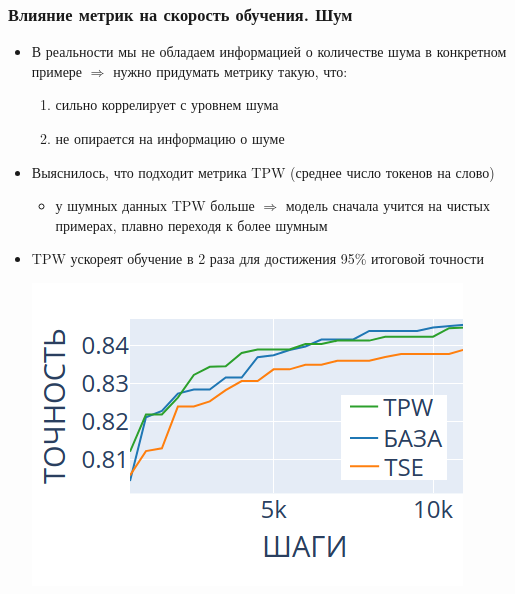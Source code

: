 \documentclass{beamer}
\begin{document}
\begin{frame}
	\frametitle{Влияние метрик на скорость обучения. Шум}
	\begin{itemize}
		\item В реальности мы не обладаем информацией о количестве шума в конкретном примере $\Rightarrow$ нужно придумать метрику такую, что:
		\begin{enumerate}
			\item сильно коррелирует с уровнем шума
			\item не опирается на информацию о шуме
		\end{enumerate}
		\item Выяснилось, что подходит метрика TPW (среднее число токенов на слово)
			\begin{itemize}
				\item у шумных данных TPW больше $\Rightarrow$ модель сначала учится на чистых примерах, плавно переходя к более шумным
			\end{itemize}
		\item TPW ускореят обучение в 2 раза для достижения 95\% итоговой точности
		\centering
		
		\includegraphics[scale=0.4]{keyboard_noise_TPW_win}		
	\end{itemize}
\end{frame}
\end{document}
